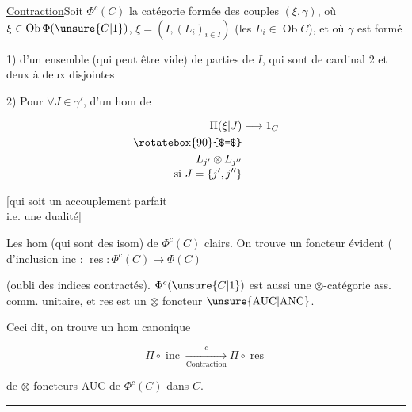 
\uline{Contraction}\quad Soit $\Phi^c(C)$ la catégorie formée des  couples $(\xi,\gamma)$, où $\xi\in\operatorname{Ob}\Phi(\unsure{C|1})$, $\xi=(I,(L_i)_{i\in I})$ (les $L_i\in\operatorname{Ob}C$), et où $\gamma$ est formé

1) d'un ensemble  (qui peut être vide) de parties de $I$, qui sont  de cardinal 2 et deux à deux disjointes

2) Pour $\forall J\in\gamma'$, d'un hom de

\[
\begin{aligned}\Pi(\xi|J)&\longrightarrow1_C\\
\rotatebox{90}{$=$}&\\
L_{j'}\otimes L_{j''}&\\[-2pt]\text{si }J=\{j',j''\}&
\end{aligned}
\]


[qui soit un accouplement parfait\\ i.e. une dualité]

 Les hom (qui sont des isom) de $\Phi^c(C)$ clairs. On trouve un foncteur évident  ( d'inclusion inc : $\operatorname{res}:\Phi^c(C)\longrightarrow\Phi(C)$

(oubli des indices contractés). $\Phi^c(\unsure{C|1})$ est aussi une $\otimes$-catégorie ass. comm.  unitaire, et res est un $\otimes$ foncteur $\unsure{\mathrm{AUC}|\mathrm{ANC}}$.

Ceci dit, on trouve un hom canonique

\[\Pi\circ\operatorname{inc}\xrightarrow[\text{Contraction}]{c}\Pi\circ\operatorname{res}\]

de $\otimes$-foncteurs AUC de $\Phi^c(C)$ dans $C$.

\noindent\hfil\rule{2.7em}{.4pt}\hfil

